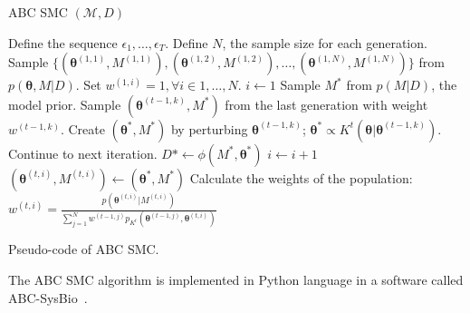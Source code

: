 \begin{algorithm}[h]
\textsc{ABC SMC} $(\mathcal{M}, D)$
\begin{algorithmic}[1]
    \State Define the sequence $\epsilon_1, \ldots, \epsilon_T$.
    \State Define $N$, the sample size for each generation. 
    \State Sample $\{({\bm \theta}^{(1, 1)}, M^{(1, 1)}), 
                     ({\bm \theta}^{(1, 2)}, M^{(1, 2)}), \ldots, 
                     ({\bm \theta}^{(1, N)}, M^{(1, N)})\}$ from 
                     $p ({\bm \theta}, M| D)$.
    \State Set $w^{(1, i)} = 1, \forall i \in {1, \ldots, N}$.  
        \State $i \gets 1$
            \State Sample $M^*$ from $p (M | D)$, the model prior.
            \State Sample $({\bm \theta}^{(t - 1, k)}, M^*)$ from the 
                last generation with weight $w^{(t - 1, k)}$.
            \State Create $({\bm \theta}^*, M^*)$ by perturbing 
                ${\bm \theta}^{(t - 1, k)}$; 
                ${\bm \theta}^* \propto K^t({\bm \theta} | 
                {\bm \theta}^{(t - 1, k)})$.
                \State Continue to next iteration.
            \EndIf
            \State $D* \gets \phi (M^*, {\bm \theta}^*)$
                \State $i \gets i + 1$
                \State $({\bm \theta}^{(t, i)}, M^{(t, i)}) \gets 
                    ({\bm \theta}^*, M^*)$
            \EndIf
        \EndWhile
        \State Calculate the weights of the population:
            $w^{(t, i)} = \frac{p ({\bm \theta}^{(t, i)} | M^{(t, i)})}
                         {\sum_{j = 1}^N w^{(t-1, j)}p_{K^t}
                            ({\bm \theta}^{(t-1, j)}, {\bm \theta}^{(t,
                            i)})}$
    \EndFor
    \Return
\end{algorithmic}
\caption{Pseudo-code of ABC SMC.}
\label{code:abc_smc}
\end{algorithm}
The ABC SMC algorithm is implemented in Python language in a software called 
ABC-SysBio~\cite{Liepe2014}.

